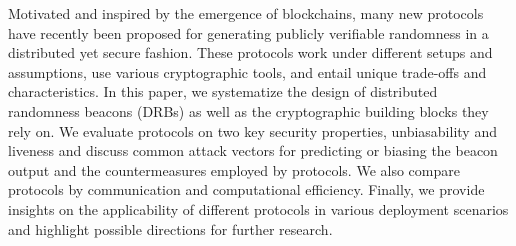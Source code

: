 Motivated and inspired by the emergence of blockchains, many new protocols have recently been proposed for generating publicly verifiable randomness in a distributed yet secure fashion. These protocols work under different setups and assumptions, use various cryptographic tools, and entail unique trade-offs and characteristics. In this paper, we systematize the design of distributed randomness beacons (DRBs) as well as the cryptographic building blocks they rely on.
We evaluate protocols on two key security properties, unbiasability and liveness and discuss common attack vectors for predicting or biasing the beacon output and the countermeasures employed by protocols. We also compare protocols by communication and computational efficiency.
Finally, we provide insights on the applicability of different protocols in various deployment scenarios and highlight possible directions for further research.
